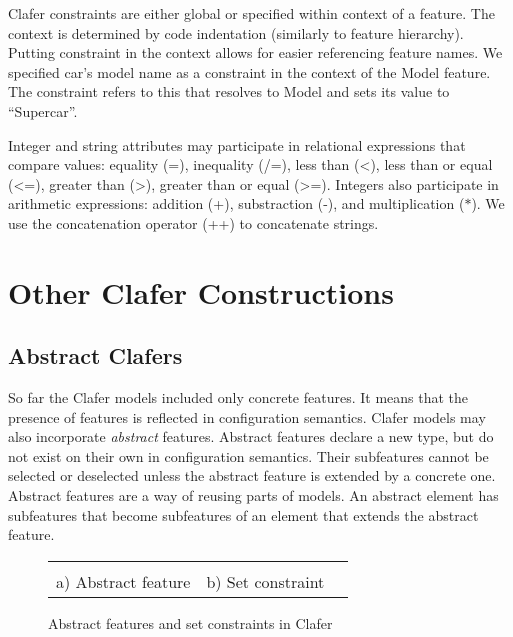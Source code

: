 \documentclass{llncs}
\begin{document}
Clafer constraints are either global or specified within context of a feature. The context is determined by code indentation (similarly to feature hierarchy). Putting constraint in the context allows for easier referencing feature names. We specified car's model name as a constraint in the context of the \textsf{Model} feature. The constraint refers to \textsf{this} that resolves to \textsf{Model} and sets its value to ``Supercar''.

Integer and string attributes may participate in relational expressions that compare values: equality (\textsf{=}), inequality (\textsf{/=}), less than (\textsf{<}), less than or equal (\textsf{<=}), greater than (\textsf{>}), greater than or equal (\textsf{>=}). Integers also participate in arithmetic expressions: addition (\textsf{+}), substraction (\textsf{-}), and multiplication (\textsf{$\ast$}). We use the concatenation operator (\textsf{++}) to concatenate strings.

\section{Other Clafer Constructions}

\subsection{Abstract Clafers}

So far the Clafer models included only concrete features. It means that the presence of features is reflected in configuration semantics. Clafer models may also incorporate \textit{abstract} features. Abstract features declare a new type, but do not exist on their own in configuration semantics. Their subfeatures cannot be selected or deselected unless the abstract feature is extended by a concrete one. Abstract features are a way of reusing parts of models. An abstract element has subfeatures that become subfeatures of an element that extends the abstract feature. 

\begin{figure}[t]
  \begin{center}
    \begin{tabular}{ccc}
      \begin{minipage}[t]{3.5cm}
        \vspace{0pt}
        
      \end{minipage}
      &
      \begin{minipage}[t]{3.5cm}
        \vspace{0pt}
        
      \end{minipage}\\[0.2cm]
      a) Abstract feature & b) Set constraint
    \end{tabular}
  \end{center}
  \caption{Abstract features and set constraints in Clafer\label{fig:absautofm}}
\end{figure}
\end{document}
